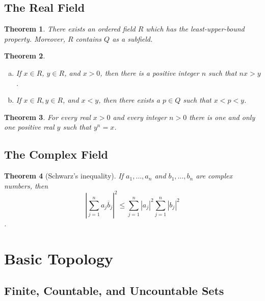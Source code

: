 \documentclass{article}
\newtheorem{theorem}{Theorem}
\numberwithin{theorem}{section}
\begin{document}
\subsection*{The Real Field}

\setcounter{theorem}{18}
\begin{theorem}
  There exists an ordered field $R$ which has the least-upper-bound property.
  Moreover, $R$ contains $Q$ as a subfield.
\end{theorem}

\begin{theorem}
  \begin{enumerate}[(a)]
    \item If $x \in R$, $y \in R$, and $x > 0$, then there is a positive integer
      $n$ such that $nx > y$.
    \item If $x \in R, y \in R$, and $x < y$, then there exists a $p \in Q$ such
      that $x < p < y$.
  \end{enumerate}
\end{theorem}

\begin{theorem}
  For every real $x > 0$ and every integer $n > 0$ there is one and only one
  positive real $y$ such that $y^n = x$.
\end{theorem}

\subsection*{The Complex Field}

\setcounter{theorem}{34}
\begin{theorem}[Schwarz's inequality]
  If $a_1, \ldots, a_n$ and $b_1, \ldots, b_n$ are complex numbers, then \[
    \left|\sum_{j=1}^n a_j\overline{b}_j\right|^2 \leq
    \sum_{j=1}^n |a_j|^2 \sum_{j=1}^n |b_j|^2
  \].
\end{theorem}

\section{Basic Topology}

\subsection*{Finite, Countable, and Uncountable Sets}
\end{document}
